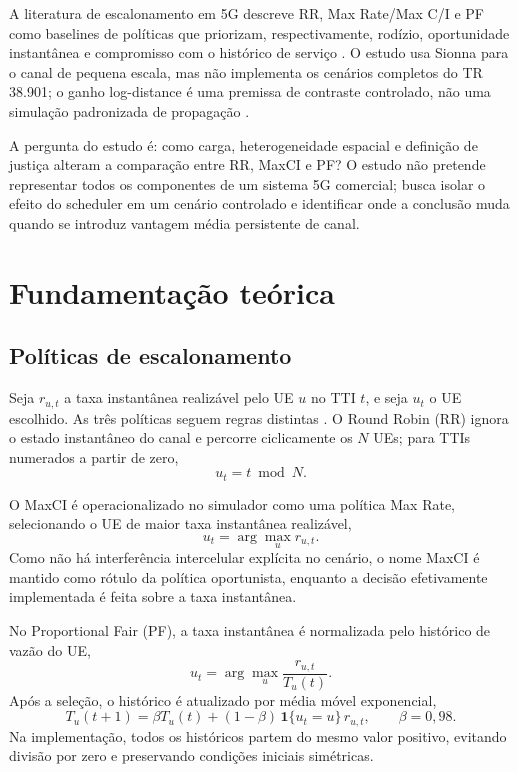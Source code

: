 \documentclass[12pt]{article}
\begin{document}
A literatura de escalonamento em 5G descreve RR, Max Rate/Max C/I e PF como baselines de políticas que priorizam, respectivamente, rodízio, oportunidade instantânea e compromisso com o histórico de serviço \cite{9773317}. O estudo usa Sionna para o canal de pequena escala, mas não implementa os cenários completos do TR 38.901; o ganho log-distance é uma premissa de contraste controlado, não uma simulação padronizada de propagação \cite{3gpp38901}.

A pergunta do estudo é: como carga, heterogeneidade espacial e definição de justiça alteram a comparação entre RR, MaxCI e PF? O estudo não pretende representar todos os componentes de um sistema 5G comercial; busca isolar o efeito do scheduler em um cenário controlado e identificar onde a conclusão muda quando se introduz vantagem média persistente de canal.

\section{Fundamentação teórica}

\subsection{Políticas de escalonamento}

Seja $r_{u,t}$ a taxa instantânea realizável pelo UE $u$ no TTI $t$, e seja $u_t$ o UE escolhido. As três políticas seguem regras distintas \cite{9773317}. O Round Robin (RR) ignora o estado instantâneo do canal e percorre ciclicamente os $N$ UEs; para TTIs numerados a partir de zero,
\begin{equation}
u_t=t\bmod N.
\end{equation}

O MaxCI é operacionalizado no simulador como uma política Max Rate, selecionando o UE de maior taxa instantânea realizável,
\begin{equation}
u_t=\arg\max_u r_{u,t}.
\end{equation}
Como não há interferência intercelular explícita no cenário, o nome MaxCI é mantido como rótulo da política oportunista, enquanto a decisão efetivamente implementada é feita sobre a taxa instantânea.

No Proportional Fair (PF), a taxa instantânea é normalizada pelo histórico de vazão do UE,
\begin{equation}
u_t=\arg\max_u\frac{r_{u,t}}{T_u(t)}.
\end{equation}
Após a seleção, o histórico é atualizado por média móvel exponencial,
\begin{equation}
T_u(t+1)=\beta T_u(t)+(1-\beta)\,\mathbf{1}\{u_t=u\}\,r_{u,t},
\qquad \beta=0{,}98.
\end{equation}
Na implementação, todos os históricos partem do mesmo valor positivo, evitando divisão por zero e preservando condições iniciais simétricas.
\end{document}
